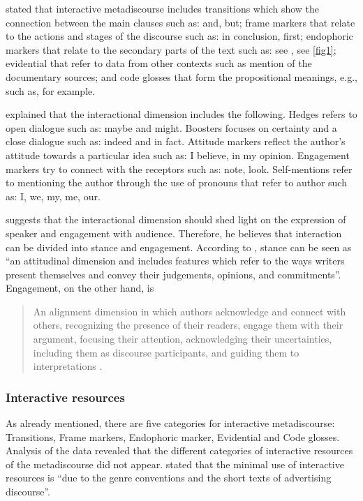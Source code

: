 \documentclass[english]{textolivre}
\begin{document}
\textcite{ebrahimi_role_2018} stated that interactive metadiscourse includes transitions which show the connection between the main clauses such as: and, but; frame markers that relate to the actions and stages of the discourse such as: in conclusion, first; endophoric markers that relate to the secondary parts of the text such as: see , see \cref{fig1}; evidential that refer to data from other contexts such as mention of the documentary sources; and code glosses that form the propositional meanings, e.g., such as, for example.

\textcite{al-subhi_metadiscourse_2022} explained that the interactional dimension includes the following. Hedges refers to open dialogue such as: maybe and might. Boosters focuses on certainty and a close dialogue such as: indeed and in fact. Attitude markers reflect the author’s attitude towards a particular idea such as: I believe, in my opinion. Engagement markers try to connect with the receptors such as: note, look. Self-mentions refer to mentioning the author through the use of pronouns that refer to author such as: I, we, my, me, our.

\textcite{hyland_metadiscourse:_2005} suggests that the interactional dimension should shed light on the expression of speaker and engagement with audience. Therefore, he believes that interaction can be divided into stance and engagement. According to \textcite[p.~5]{hyland_stance_2005b}, stance can be seen as “an attitudinal dimension and includes features which refer to the ways writers present themselves and convey their judgements, opinions, and commitments”. Engagement, on the other hand, is 

\begin{quote}
    An alignment dimension in which authors acknowledge and connect with others, recognizing the presence of their readers, engage them with their argument, focusing their attention, acknowledging their uncertainties, including them as discourse participants, and guiding them to interpretations \cite[p.~176]{hyland_stance_2005b}.
\end{quote}


\subsubsection{Interactive resources}\label{sec-listas}
As already mentioned, there are five categories for interactive metadiscourse: Transitions, Frame markers, Endophoric marker, Evidential and Code glosses. Analysis of the data revealed that the different categories of interactive resources of the metadiscourse did not appear. \textcite[p.~27]{al-subhi_metadiscourse_2022} stated that the minimal use of interactive resources is “due to the genre conventions and the short texts of advertising discourse”.
\end{document}
